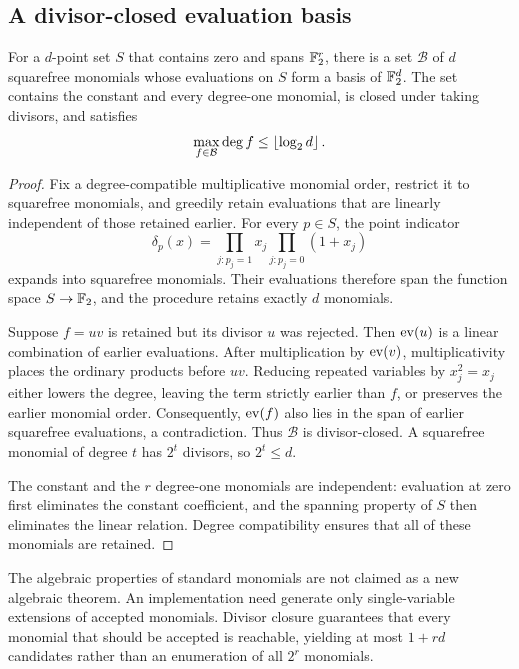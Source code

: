\subsection{A divisor-closed evaluation basis}
\begin{lemma}\label{lem:monomial}
For a $d$-point set $S$ that contains zero and spans $\mathbb F_2^r$, there is a set $\mathcal B$ of $d$ squarefree monomials whose evaluations on $S$ form a basis of $\mathbb F_2^d$. The set contains the constant and every degree-one monomial, is closed under taking divisors, and satisfies
\begin{equation}
\max_{f\in\mathcal B}\deg f\le\left\lfloor \log_2d\right\rfloor.
\end{equation}
\end{lemma}
\begin{proof}
Fix a degree-compatible multiplicative monomial order, restrict it to squarefree monomials, and greedily retain evaluations that are linearly independent of those retained earlier. For every $p\in S$, the point indicator
\[
\delta_p(x)=\prod_{j:p_j=1}x_j\prod_{j:p_j=0}(1+x_j)
\]
expands into squarefree monomials. Their evaluations therefore span the function space $S\to\mathbb F_2$, and the procedure retains exactly $d$ monomials.

Suppose $f=uv$ is retained but its divisor $u$ was rejected. Then $\operatorname{ev}(u)$ is a linear combination of earlier evaluations. After multiplication by $\operatorname{ev}(v)$, multiplicativity places the ordinary products before $uv$. Reducing repeated variables by $x_j^2=x_j$ either lowers the degree, leaving the term strictly earlier than $f$, or preserves the earlier monomial order. Consequently, $\operatorname{ev}(f)$ also lies in the span of earlier squarefree evaluations, a contradiction. Thus $\mathcal B$ is divisor-closed. A squarefree monomial of degree $t$ has $2^t$ divisors, so $2^t\le d$.

The constant and the $r$ degree-one monomials are independent: evaluation at zero first eliminates the constant coefficient, and the spanning property of $S$ then eliminates the linear relation. Degree compatibility ensures that all of these monomials are retained.
\end{proof}
The algebraic properties of standard monomials are not claimed as a new algebraic theorem. An implementation need generate only single-variable extensions of accepted monomials. Divisor closure guarantees that every monomial that should be accepted is reachable, yielding at most $1+rd$ candidates rather than an enumeration of all $2^r$ monomials.

